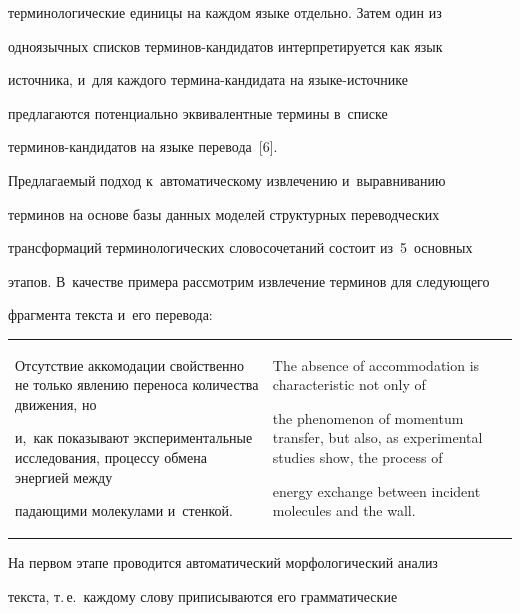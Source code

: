 терминологические единицы на каждом языке отдельно. Затем один из 


одноязычных списков тер\-ми\-нов-кан\-ди\-да\-тов интерпретируется как язык 


источника, и~для каждого тер\-ми\-на-кан\-ди\-да\-та на язы\-ке-ис\-точ\-ни\-ке 


предлагаются потенциально эквивалентные термины в~списке  


тер\-ми\-нов-кан\-ди\-да\-тов на языке перевода~[6].


  


  Предлагаемый подход к~автоматическому извлечению и~выравниванию 


терминов на основе базы данных моделей структурных переводческих 


трансформаций терминологических словосочетаний состоит из~5~основных 


этапов. В~качестве примера рассмотрим извлечение терминов для следующего 


фрагмента текста и~его перевода: 


  \begin{center}




 {\small \begin{tabular}{p{61mm}p{61mm}}


Отсутствие аккомодации свойственно не только явлению переноса количества движения, но 


и,~как показывают экспериментальные исследования, процессу обмена энергией между 


падающими молекулами и~стенкой.&The absence of accommodation is characteristic not only of 


the phenomenon of momentum transfer, but also, as experimental studies show, the process of 


energy exchange between incident molecules and the wall.


\end{tabular}


}


\end{center}








     На первом этапе проводится автоматический морфологический анализ 


текста, т.\,е.\ каждому слову приписываются его грамматические 


